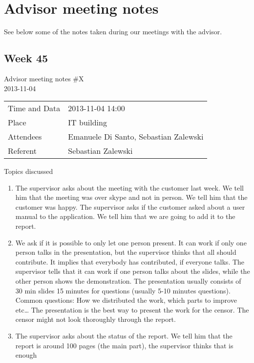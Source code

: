 \clearpage
\section{Advisor meeting notes}

See below some of the notes taken during our meetings with the advisor.

\subsection{Week 45}

\begin{center}
Advisor meeting notes \#X \\
2013-11-04 \\
\end{center}

\begin{table}[H]
\begin{center}
\begin{tabular}{ l | l }
Time and Data & 2013-11-04 14:00 \\
Place & IT building \\
Attendees & Emanuele Di Santo, Sebastian Zalewski \\
Referent & Sebastian Zalewski \\
\end{tabular}
\end{center}
\end{table}

Topics discussed
\begin{enumerate}[1.]
\item The supervisor asks about the meeting with the customer last week. We tell him that the meeting was over skype and not in person. We tell him that the customer was happy. The supervisor asks if the customer asked about a user manual to the application. We tell him that we are going to add it to the report.

\item We ask if it is possible to only let one person present. It can work if only one person talks in the presentation, but the supervisor thinks that all should contribute. It implies that everybody has contributed, if everyone talks. The supervisor tells that it can work if one person talks about the slides, while the other person shows the demonstration. The presentation usually consists of 30 min slides 15 minutes for questions (usually 5-10 minutes questions). Common questions: How we distributed the work, which parts to improve etc… The presentation is the best way to present the work for the censor. The censor might not look thoroughly through the report.

\item The supervisor asks about the status of the report. We tell him that the report is around 100 pages (the main part), the supervisor thinks that is enough
\end{enumerate}

